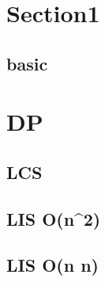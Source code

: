 \section{Section1}
    \subsection{basic}
        

%         

\section{DP}
    \subsection{LCS}
        
    \subsection{LIS O(n^2)}
         
    \subsection{LIS O(n \log n)}
        

